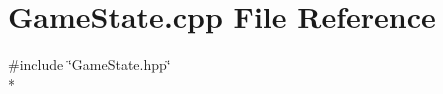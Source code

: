 \section{Game\-State.\-cpp File Reference}
\label{_game_state_8cpp}
{\ttfamily \#include \char`\"{}Game\-State.\-hpp\char`\"{}}\\*
